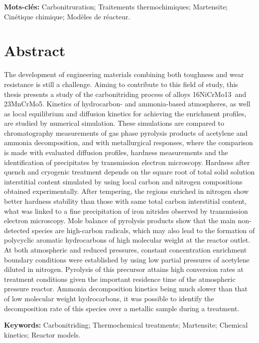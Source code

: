 \par\vskip0.6cm
\noindent\textbf{Mots-clés:} Carbonitruration; Traitements thermochimiques; Martensite; Cinétique chimique; Modèles de réacteur.

\clearpage{}
{}
\chapter*{Abstract}

The development of engineering materials combining both toughness and wear resistance is still a challenge. Aiming to contribute to this field of study, this thesis presents a study of the carbonitriding process of alloys 16NiCrMo13~and 23MnCrMo5. Kinetics of hydrocarbon- and ammonia-based atmospheres, as well as local equilibrium and diffusion kinetics for achieving the enrichment profiles, are studied by numerical simulation. These simulations are compared to chromatography measurements of gas phase pyrolysis products of acetylene and ammonia decomposition, and with metallurgical responses, where the comparison is made with evaluated diffusion profiles, hardness measurements and the identification of precipitates by transmission electron microscopy. Hardness after quench and cryogenic treatment depends on the square root of total solid solution interstitial content simulated by using local carbon and nitrogen compositions obtained experimentally. After tempering, the regions enriched in nitrogen show better hardness stability than those with same total carbon interstitial content, what was linked to a fine precipitation of iron nitrides observed by transmission electron microscopy. Mole balance of pyrolysis products show that the main non-detected species are high-carbon radicals, which may also lead to the formation of polycyclic aromatic hydrocarbons of high molecular weight at the reactor outlet. At both atmospheric and reduced pressures, constant concentration enrichment boundary conditions were established by using low partial pressures of acetylene diluted in nitrogen. Pyrolysis of this precursor attains high conversion rates at treatment conditions given the important residence time of the atmospheric pressure reactor. Ammonia decomposition kinetics being much slower than that of low molecular weight hydrocarbons, it was possible to identify the decomposition rate of this species over a metallic sample during  a treatment. 

\par\vskip0.6cm
\noindent\textbf{Keywords:} Carbonitriding; Thermochemical treatments; Martensite; Chemical kinetics; Reactor models.

\endinput
